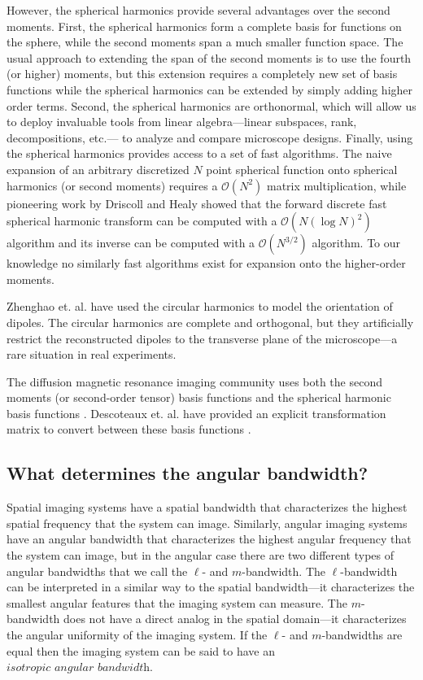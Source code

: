 \documentclass[]{osa-article}
\providecommand{\mc}[1]{\mathcal{#1}}
\begin{document}
However, the spherical harmonics provide several advantages over the second
moments. First, the spherical harmonics form a complete basis for functions on
the sphere, while the second moments span a much smaller function space. The
usual approach to extending the span of the second moments is to use the fourth
(or higher) moments, but this extension requires a completely new set of basis
functions while the spherical harmonics can be extended by simply adding higher order
terms. Second, the spherical harmonics are orthonormal, which will allow us to
deploy invaluable tools from linear algebra---linear subspaces, rank,
decompositions, etc.--- to analyze and compare microscope designs. Finally,
using the spherical harmonics provides access to a set of fast algorithms. The
naive expansion of an arbitrary discretized $N$ point spherical function onto
spherical harmonics (or second moments) requires a $\mc{O}(N^2)$ matrix
multiplication, while pioneering work by Driscoll and Healy \cite{driscoll1994}
showed that the forward discrete fast spherical harmonic transform can be
computed with a $\mc{O}(N(\log N)^2)$ algorithm and its inverse can be computed
with a $\mc{O}(N^{3/2})$ algorithm. To our knowledge no similarly fast
algorithms exist for expansion onto the higher-order moments.

Zhenghao et. al. \cite{zhanghao2017} have used the circular harmonics to model
the orientation of dipoles. The circular harmonics are complete and orthogonal,
but they artificially restrict the reconstructed dipoles to the transverse
plane of the microscope---a rare situation in real experiments.

The diffusion magnetic resonance imaging community uses both the second moments
(or second-order tensor) basis functions \cite{basser1994} and the spherical
harmonic basis functions \cite{tournier2004}. Descoteaux et. al. have provided
an explicit transformation matrix to convert between these basis functions
\cite{descoteaux2006}.


\subsection{What determines the angular bandwidth?}
Spatial imaging systems have a spatial bandwidth that characterizes the highest
spatial frequency that the system can image. Similarly, angular imaging systems
have an angular bandwidth that characterizes the highest angular frequency that
the system can image, but in the angular case there are two different types of
angular bandwidths that we call the $\ell$- and $m$-bandwidth. The $\ell$-bandwidth
can be interpreted in a similar way to the spatial bandwidth---it characterizes
the smallest angular features that the imaging system can measure. The
$m$-bandwidth does not have a direct analog in the spatial domain---it
characterizes the angular uniformity of the imaging system. If the $\ell$- and
$m$-bandwidths are equal then the imaging system can be said to have an 
$\textit{isotropic angular bandwidth}$.
\end{document}
